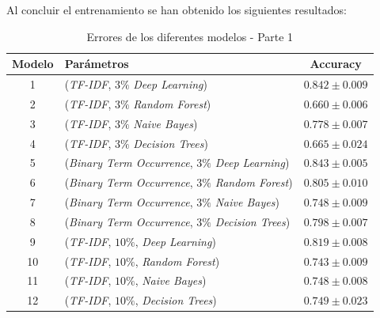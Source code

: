 \documentclass[es]{uc3mreport}
\begin{document}
\begin{report}
    Al concluir el entrenamiento se han obtenido los siguientes resultados:

    \begin{table}[H]
        \begin{center}
            \begin{tabular}{ @{}clc@{} }
                \toprule
                Modelo & Parámetros\footnotemark[1] & Accuracy\\
                \midrule
                1  & (\textit{TF-IDF}, $3\%$                 \textit{Deep Learning})  & $0.842 \pm 0.009$ \\
                2  & (\textit{TF-IDF}, $3\%$                 \textit{Random Forest})  & $0.660 \pm 0.006$ \\
                3  & (\textit{TF-IDF}, $3\%$                 \textit{Naive Bayes})    & $0.778 \pm 0.007$ \\
                4  & (\textit{TF-IDF}, $3\%$                 \textit{Decision Trees}) & $0.665 \pm 0.024$ \\
                5  & (\textit{Binary Term Occurrence}, $3\%$ \textit{Deep Learning})  & $0.843 \pm 0.005$ \\
                6  & (\textit{Binary Term Occurrence}, $3\%$ \textit{Random Forest})  & $0.805 \pm 0.010$ \\
                7  & (\textit{Binary Term Occurrence}, $3\%$ \textit{Naive Bayes})    & $0.748 \pm 0.009$ \\
                8  & (\textit{Binary Term Occurrence}, $3\%$ \textit{Decision Trees}) & $0.798 \pm 0.007$ \\
                9  & (\textit{TF-IDF}, $10\%$,               \textit{Deep Learning})  & $0.819 \pm 0.008$ \\
                10 & (\textit{TF-IDF}, $10\%$,               \textit{Random Forest})  & $0.743 \pm 0.009$ \\
                11 & (\textit{TF-IDF}, $10\%$,               \textit{Naive Bayes})    & $0.748 \pm 0.008$ \\
                12 & (\textit{TF-IDF}, $10\%$,               \textit{Decision Trees}) & $0.749 \pm 0.023$ \\
                \bottomrule
            \end{tabular}
            \caption{Errores de los diferentes modelos - Parte 1}
        \end{center}
    \end{table}


\end{report}
\end{document}
